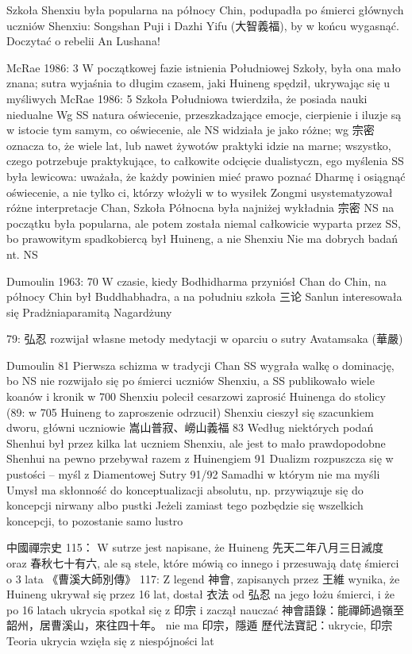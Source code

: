 Szkoła Shenxiu była popularna na północy Chin, podupadła po śmierci głównych uczniów Shenxiu: Songshan Puji i Dazhi Yifu (大智義福), by w końcu wygasnąć. %
Doczytać o rebelii An Lushana!

McRae 1986: 3
W początkowej fazie istnienia Południowej Szkoły, była ona mało znana; sutra wyjaśnia to długim czasem, jaki Huineng spędził, ukrywając się u myśliwych
McRae 1986: 5
Szkoła Południowa twierdziła, że posiada nauki niedualne
Wg SS natura oświecenie, przeszkadzające emocje, cierpienie i iluzje są w istocie tym samym, co oświecenie, ale NS widziała je jako różne; wg 宗密 oznacza to, że wiele lat, lub nawet żywotów praktyki idzie na marne; wszystko, czego potrzebuje praktykujące, to całkowite odcięcie dualistyczn, ego myślenia
SS była lewicowa: uważała, że każdy powinien mieć prawo poznać Dharmę i osiągnąć oświecenie, a nie tylko ci, którzy włożyli w to wysiłek
Zongmi usystematyzował różne interpretacje Chan, Szkoła Północna była najniżej
wykładnia 宗密 NS na początku była popularna, ale potem została niemal całkowicie wyparta przez SS, bo prawowitym spadkobiercą był Huineng, a nie Shenxiu
Nie ma dobrych badań nt. NS

Dumoulin 1963: 70
W czasie, kiedy Bodhidharma przyniósł Chan do Chin, na północy Chin był Buddhabhadra, a na południu szkoła 三论
Sanlun interesowała się Pradżniaparamitą Nagardżuny

79: 弘忍 rozwijał własne metody medytacji w oparciu o sutry Avatamsaka (華嚴)

Dumoulin 81
Pierwsza schizma w tradycji Chan
SS wygrała walkę o dominację, bo NS nie rozwijało się po śmierci uczniów Shenxiu, a SS publikowało wiele koanów i kronik
w 700 Shenxiu polecił cesarzowi zaprosić Huinenga do stolicy
(89: w 705 Huineng to zaproszenie odrzucił)
Shenxiu cieszył się szacunkiem dworu, główni uczniowie 嵩山普寂、嶗山義福
83
Według niektórych podań Shenhui był przez kilka lat uczniem Shenxiu, ale jest to mało prawdopodobne
Shenhui na pewno przebywał razem z Huinengiem
91 Dualizm rozpuszcza się w pustości -- myśl z Diamentowej Sutry
91/92 Samadhi w którym nie ma myśli
Umysł ma skłonność do konceptualizacji absolutu, np. przywiązuje się do koncepcji nirwany albo pustki
Jeżeli zamiast tego pozbędzie się wszelkich koncepcji, to pozostanie samo lustro


中國禪宗史 115：
W sutrze jest napisane, że Huineng 先天二年八月三日滅度 oraz 春秋七十有六, ale są stele, które mówią co innego i przesuwają datę śmierci o 3 lata
《曹溪大師別傳》
117: Z legend 神會, zapisanych przez 王維 wynika, że Huineng ukrywał się przez 16 lat, dostał 衣法 od 弘忍 na jego łożu śmierci, i że po 16 latach ukrycia spotkał się z 印宗 i zaczął nauczać
神會語錄：能禪師過嶺至韶州，居曹溪山，來往四十年。 nie ma 印宗，隱遁
歷代法寶記：ukrycie, 印宗
Teoria ukrycia wzięła się z niespójności lat

